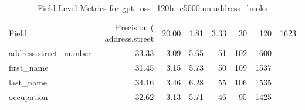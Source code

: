 \begin{table}
\caption{Field-Level Metrics for gpt_oss_120b_c5000 on address_books}
\label{tab:fields_gpt_oss_120b_c5000_address_books}
\begin{tabular}{lrrrrrr}
\toprule
Field & Precision (%
\midrule
address.street & 20.00 & 1.81 & 3.33 & 30 & 120 & 1623 \\
address.street_number & 33.33 & 3.09 & 5.65 & 51 & 102 & 1600 \\
first_name & 31.45 & 3.15 & 5.73 & 50 & 109 & 1537 \\
last_name & 34.16 & 3.46 & 6.28 & 55 & 106 & 1535 \\
occupation & 32.62 & 3.13 & 5.71 & 46 & 95 & 1425 \\
\bottomrule
\end{tabular}
\end{table}
